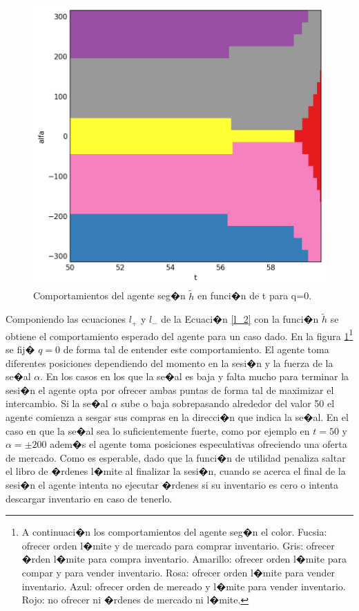 \documentclass[12pt,a4paper,spanish]{article}%
\begin{document}
\begin{figure}[H]
	\centering
	\includegraphics[width=0.7\linewidth]{figuras/positioning_vs_q_final}
	\caption{Comportamientos del agente seg�n $\tilde{h}$ en funci�n de t para q=0.}
	\label{fig:positioningvsq}
\end{figure}

Componiendo las ecuaciones $l_+$ y $l_-$ de la Ecuaci�n \ref{l_2} con la funci�n $\tilde{h}$ se obtiene el comportamiento esperado del agente para un caso dado. En la figura \ref{fig:positioningvsq}\footnote{A continuaci�n los comportamientos del agente seg�n el color. Fucsia: ofrecer orden l�mite y de mercado para comprar inventario. Gris: ofrecer �rden l�mite para compra inventario. Amarillo: ofrecer orden l�mite para compar y para vender inventario. Rosa: ofrecer orden l�mite para vender inventario. Azul: ofrecer orden de mercado y l�mite para vender inventario. Rojo: no ofrecer ni �rdenes de mercado ni l�mite.} se fij� $q=0$ de forma tal de entender este comportamiento. El agente toma diferentes posiciones dependiendo del momento en la sesi�n y la fuerza de la se�al $\alpha$. En los casos en los que la se�al es baja y falta mucho para terminar la sesi�n el agente opta por ofrecer ambas puntas de forma tal de maximizar el intercambio. Si la se�al $\alpha$ sube o baja sobrepasando alrededor del valor 50 el agente comienza a sesgar sus compras en la direcci�n que indica la se�al. En el caso en que la se�al sea lo suficientemente fuerte, como por ejemplo en $t=50$ y $\alpha=\pm 200$ adem�s el agente toma posiciones especulativas ofreciendo una oferta de mercado. Como es esperable, dado que la funci�n de utilidad penaliza saltar el libro de �rdenes l�mite al finalizar la sesi�n, cuando se acerca el final de la sesi�n el agente intenta no ejecutar �rdenes si su inventario es cero o intenta descargar inventario en caso de tenerlo.
\end{document}
